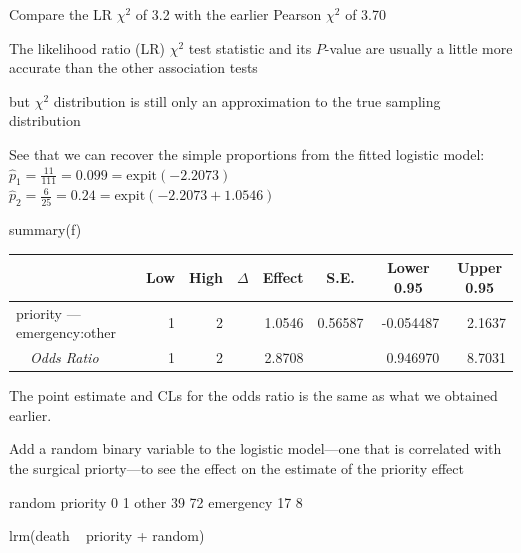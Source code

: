 \bi 
\item Compare the LR $\chi^2$ of 3.2 with the earlier Pearson $\chi^2$ of 3.70
\item The likelihood ratio (LR) $\chi^2$ test statistic and its $P$-value are usually a little more accurate than the other association tests
 \bi
 \item but $\chi^2$ distribution is still only an approximation to the true sampling distribution
 \ei
\item See that we can recover the simple proportions from the fitted logistic model:\\
$\hat{p}_1 = \frac{11}{111} = 0.099 = \textrm{expit}(-2.2073)$\\
$\hat{p}_2 = \frac{6}{25} = 0.24 = \textrm{expit}(-2.2073 + 1.0546)$
\ei 

\begin{Sinput}
summary(f)
\end{Sinput}
\begin{center}
\begin{tabular}{lrrrrrrr}
\hline\hline
\multicolumn{1}{l}{}&\multicolumn{1}{c}{Low}&\multicolumn{1}{c}{High}&\multicolumn{1}{c}{$\Delta$}&\multicolumn{1}{c}{Effect}&\multicolumn{1}{c}{S.E.}&\multicolumn{1}{c}{Lower 0.95}&\multicolumn{1}{c}{Upper 0.95}\tabularnewline
\hline
priority --- emergency:other&1&2&&1.0546&0.56587&-0.054487&2.1637\tabularnewline
~~{\it Odds Ratio}&1&2&&2.8708&& 0.946970&8.7031\tabularnewline
\hline
\end{tabular}\end{center}


\bi
\item The point estimate and CLs for the odds ratio is the same as what we obtained earlier.
\ei

Add a random binary variable to the logistic model---one that is correlated with the surgical priorty---to see the effect on the estimate of the priority effect

\begin{Schunk}
\begin{Soutput}
           random
priority     0  1
  other     39 72
  emergency 17  8
\end{Soutput}
\end{Schunk}
\begin{Sinput}
lrm(death ~ priority + random)
\end{Sinput}

